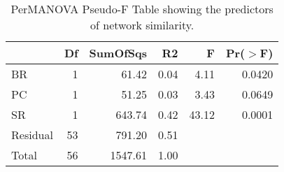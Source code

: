 \begin{table}[ht]
\centering
\begin{tabular}{lrrrrr}
  \hline
 & Df & SumOfSqs & R2 & F & Pr($>$F) \\ 
  \hline
BR & 1 & 61.42 & 0.04 & 4.11 & 0.0420 \\ 
  PC & 1 & 51.25 & 0.03 & 3.43 & 0.0649 \\ 
  SR & 1 & 643.74 & 0.42 & 43.12 & 0.0001 \\ 
  Residual & 53 & 791.20 & 0.51 &  &  \\ 
  Total & 56 & 1547.61 & 1.00 &  &  \\ 
   \hline
\end{tabular}
\caption{PerMANOVA Pseudo-F Table showing the predictors of network similarity.} 
\label{tab:cn_perm_ng}
\end{table}
